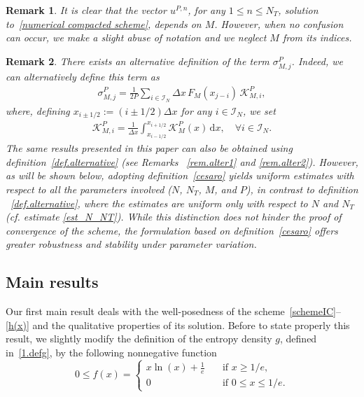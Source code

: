 \documentclass[11pt]{amsart}
\newtheorem{remark}{Remark}
\newcommand{\K}{\mathcal{K}}
\newcommand{\dd}{\mathrm{d}}
\newcommand{\I}{\mathcal{I}_N}
\begin{document}
\begin{remark}
 It is clear that the vector $u^{P,n}$, for any $1\leq n\leq N_T$, solution to~\eqref{numerical compacted scheme}, depends on $M$. However, when no confusion can occur, we make a slight abuse of notation and we neglect $M$ from its indices.
\end{remark}

\begin{remark}
There exists an alternative definition of the term $\sigma^P_{M,j}$. Indeed, we can alternatively define this term as
\begin{align}\label{def.alternative}
\sigma^P_{M,j} = \frac{1}{2P} \sum_{i \in \I} \Delta x \, F_M(x_{j-i}) \, \K^P_{M,i},
\end{align}
where, defining $x_{i\pm 1/2} := (i\pm 1/2) \Delta x$ for any $i \in \I$, we set
\begin{align*}
\K^P_{M,i} = \frac{1}{\Delta x} \int_{x_{i-1/2}}^{x_{i+1/2}} \K^P_M(x) \, \dd x, \quad \forall i \in \I.
\end{align*}
The same results presented in this paper can also be obtained using definition~\eqref{def.alternative}  (see Remarks ~\ref{rem.alter1} and \ref{rem.alter2}). However, as will be shown below, adopting definition~\eqref{cesaro} yields uniform estimates with respect to all the parameters involved ($N$, $N_T$, $M$, and $P$), in contrast to definition ~\eqref{def.alternative}, where the estimates are uniform only with respect to $N$ and $N_T$ (cf. estimate \eqref{est_N_NT}). While this distinction does not hinder the proof of convergence of the scheme, the formulation based on definition~\eqref{cesaro} offers greater robustness and stability under parameter variation.
\end{remark}

\subsection{Main results}
Our first main result deals with the well-posedness of the scheme~\eqref{schemeIC}--\eqref{h(x)} and the qualitative properties of its solution. Before to state properly this result, we slightly modify the definition of the entropy density $g$, defined in~\eqref{1.defg}, by the following nonnegative function
\begin{equation}\label{1.deff}
    0 \leq f(x) = \begin{cases}
        x \ln(x) + \frac{1}{e} & \quad\mbox{if } x\geq 1/e,\\
        0  & \quad \mbox{if } 0 \leq x \leq  1/e.
    \end{cases}          
\end{equation}
\end{document}
